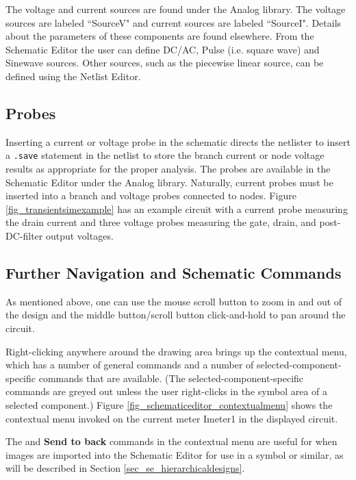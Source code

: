  The voltage and current sources are found under the \textsf{Analog} library.  The voltage sources are labeled ``\textsf{SourceV}" and current sources are labeled ``\textsf{SourceI}".  Details about the parameters of these components are found elsewhere. From the Schematic Editor the user can define DC/AC, Pulse (i.e. square wave) and Sinewave sources.  Other sources, such as the piecewise linear source, can be defined using the Netlist Editor.

\subsection{Probes}
\label{subsec_se_probes}

Inserting a current or voltage probe in the schematic directs the netlister to insert a \texttt{.save} statement in the netlist to store the branch current or node voltage results as appropriate for the proper analysis.  The probes are available in the Schematic Editor under the \textsf{Analog} library.  Naturally, current probes must be inserted into a branch and voltage probes connected to nodes.  Figure \ref{fig_transientsimexample} has an example circuit with a current probe measuring the drain current and three voltage probes measuring the gate, drain, and post-DC-filter output voltages.

\subsection{Further Navigation and Schematic Commands}
\label{subsec_se_morenavigation}

As mentioned above, one can use the mouse scroll button to zoom in and out of the design and the middle button/scroll button click-and-hold to pan around the circuit.  

Right-clicking anywhere around the drawing area brings up the contextual menu, which has a number of general commands and a number of selected-component-specific commands that are available.  (The selected-component-specific commands are greyed out unless the user right-clicks in the symbol area of a selected component.) Figure \ref{fig_schematiceditor_contextualmenu} shows the contextual menu invoked on the current meter \textsf{Imeter1} in the displayed circuit.

The  and \textbf{\textsf{Send to back}} commands in the contextual menu are useful for when images are imported into the Schematic Editor for use in a symbol or similar, as will be described in Section \ref{sec_se_hierarchicaldesigns}.  

